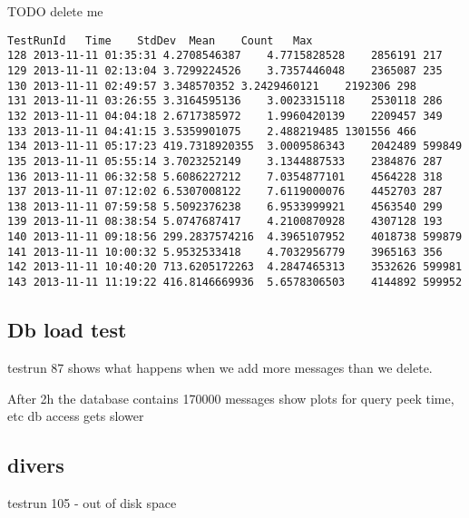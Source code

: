 \documentclass[milestone1.tex]{subfiles}
\begin{document}
TODO delete me
\begin{verbatim}
TestRunId	Time	StdDev	Mean	Count	Max
128	2013-11-11 01:35:31	4.2708546387	4.7715828528	2856191	217
129	2013-11-11 02:13:04	3.7299224526	3.7357446048	2365087	235
130	2013-11-11 02:49:57	3.348570352	3.2429460121	2192306	298
131	2013-11-11 03:26:55	3.3164595136	3.0023315118	2530118	286
132	2013-11-11 04:04:18	2.6717385972	1.9960420139	2209457	349
133	2013-11-11 04:41:15	3.5359901075	2.488219485	1301556	466
134	2013-11-11 05:17:23	419.7318920355	3.0009586343	2042489	599849
135	2013-11-11 05:55:14	3.7023252149	3.1344887533	2384876	287
136	2013-11-11 06:32:58	5.6086227212	7.0354877101	4564228	318
137	2013-11-11 07:12:02	6.5307008122	7.6119000076	4452703	287
138	2013-11-11 07:59:58	5.5092376238	6.9533999921	4563540	299
139	2013-11-11 08:38:54	5.0747687417	4.2100870928	4307128	193
140	2013-11-11 09:18:56	299.2837574216	4.3965107952	4018738	599879
141	2013-11-11 10:00:32	5.9532533418	4.7032956779	3965163	356
142	2013-11-11 10:40:20	713.6205172263	4.2847465313	3532626	599981
143	2013-11-11 11:19:22	416.8146669936	5.6578306503	4144892	599952

\end{verbatim}



\subsection{Db load test}

testrun 87 shows what happens when we add more messages than we delete. 

After 2h the database contains 170000 messages
show plots for query peek time, etc
db access gets slower

\subsection{divers}

testrun 105 - out of disk space
\end{document}

